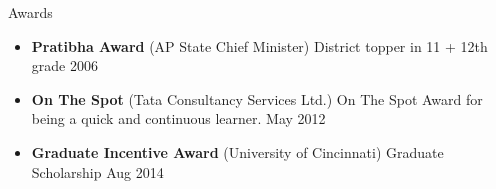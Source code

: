 \documentclass[]{mcdowellcv}
\begin{document}
\begin{cvsection}{Awards}
	\begin{cvsubsection}{}{}{}
		\begin{itemize}
			\setlength\itemsep{3pt}
			\item \textbf{Pratibha Award} (AP State Chief Minister)  District topper in 11 + 12th grade 2006
			\item \textbf{On The Spot} (Tata Consultancy Services Ltd.)  On The Spot Award for being a quick and continuous learner. May 2012
			\item \textbf{Graduate Incentive Award} (University of Cincinnati)  Graduate Scholarship Aug 2014
		\end{itemize}
	\end{cvsubsection}
\end{cvsection}
\ 
\end{document}
